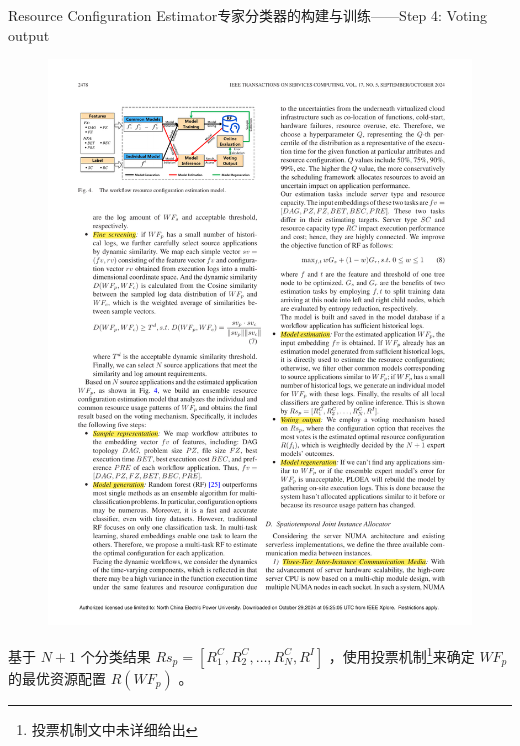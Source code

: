 \documentclass[aspectratio=169]{beamer}
\begin{document}
\begin{frame}{Resource Configuration Estimator}{专家分类器的构建与训练——Step 4: Voting output}
  \begin{figure}
    \centering
    \includegraphics[height=0.4\textheight]{img/method/resource-configuration-estimation-model.pdf}
  \end{figure}
  基于 $N+1$ 个分类结果 $Rs_p = [R_1^C, R_2^C, \dots, R_N^C, R^I]$ ，使用投票机制\footnote{\footnotesize 投票机制文中未详细给出}来确定 $WF_p$ 的最优资源配置 $R(WF_p)$ 。
\end{frame}
\end{document}

